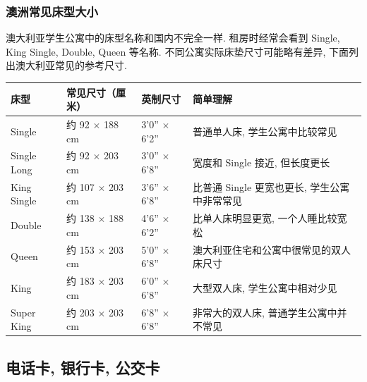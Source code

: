 \documentclass{jit-qut}
\begin{document}
\normalsize

\subsubsection{澳洲常见床型大小}

澳大利亚学生公寓中的床型名称和国内不完全一样. 租房时经常会看到 Single, King Single, Double, Queen 等名称. 不同公寓实际床垫尺寸可能略有差异, 下面列出澳大利亚常见的参考尺寸.

\scriptsize
\renewcommand{\arraystretch}{1.15}

\begin{longtable}{@{}p{}p{}p{}p{}@{}}

\toprule

床型 & 常见尺寸（厘米） & 英制尺寸 & 简单理解 \\

\midrule

\endhead

\bottomrule

\endfoot

Single & 约 92 $\times$ 188 cm & 3'0'' $\times$ 6'2'' & 普通单人床, 学生公寓中比较常见 \\

Single Long & 约 92 $\times$ 203 cm & 3'0'' $\times$ 6'8'' & 宽度和 Single 接近, 但长度更长 \\

King Single & 约 107 $\times$ 203 cm & 3'6'' $\times$ 6'8'' & 比普通 Single 更宽也更长, 学生公寓中非常常见 \\

Double & 约 138 $\times$ 188 cm & 4'6'' $\times$ 6'2'' & 比单人床明显更宽, 一个人睡比较宽松 \\

Queen & 约 153 $\times$ 203 cm & 5'0'' $\times$ 6'8'' & 澳大利亚住宅和公寓中很常见的双人床尺寸 \\

King & 约 183 $\times$ 203 cm & 6'0'' $\times$ 6'8'' & 大型双人床, 学生公寓中相对少见 \\

Super King & 约 203 $\times$ 203 cm & 6'8'' $\times$ 6'8'' & 非常大的双人床, 普通学生公寓中并不常见 \\

\end{longtable}

\normalsize

\subsection{电话卡, 银行卡, 公交卡}
\end{document}
